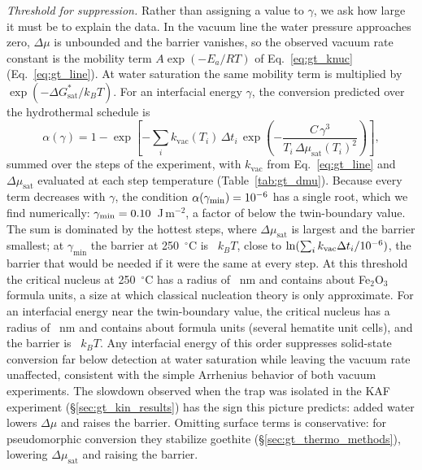 \textit{Threshold for suppression.} Rather than assigning a value to $\gamma$, we ask how large it
must be to explain the data. In the vacuum line the water pressure approaches zero, $\Delta\mu$ is
unbounded and the barrier vanishes, so the observed vacuum rate constant is the mobility term
$A\exp(-E_a/RT)$ of Eq.~\eqref{eq:gt_knuc} (Eq.~\eqref{eq:gt_line}). At water saturation the same mobility
term is multiplied by $\exp(-\Delta G^{*}_{\mathrm{sat}}/k_BT)$. For an interfacial energy $\gamma$, the
conversion predicted over the hydrothermal schedule is
\begin{equation}
  \alpha(\gamma) = 1-\exp\!\left[-\sum_i k_{\mathrm{vac}}(T_i)\,\Delta t_i\,
  \exp\!\left(-\frac{C\,\gamma^{3}}{T_i\,\Delta\mu_{\mathrm{sat}}(T_i)^{2}}\right)\right],
  \label{eq:gt_alpha_gamma}
\end{equation}
summed over the steps of the experiment, with $k_{\mathrm{vac}}$ from Eq.~\eqref{eq:gt_line} and
$\Delta\mu_{\mathrm{sat}}$ evaluated at each step temperature (Table~\ref{tab:gt_dmu}). Because every term
decreases with $\gamma$, the condition $\alpha(\gamma_{\min}) = 10^{-6}$ has a single root, which we
find numerically: $\gamma_{\min} = 0.10$~J\,m$^{-2}$, a factor of \ChTwoKinGammaRatio{} below the
twin-boundary value. The sum is dominated by the hottest steps, where $\Delta\mu_{\mathrm{sat}}$ is largest
and the barrier smallest; at $\gamma_{\min}$ the barrier at 250~$^\circ$C is \ChTwoKinBarMin~$k_BT$, close to
$\ln(\sum_i k_{\mathrm{vac}}\Delta t_i/10^{-6})$, the barrier that would be needed if it were the
same at every step. At this threshold the critical nucleus at 250~$^\circ$C has a radius of
\ChTwoKinRstarMin~nm and contains about \ChTwoKinNfuMin{} Fe$_2$O$_3$ formula units, a size at which
classical nucleation theory is only approximate. For an interfacial energy near the twin-boundary
value, the critical nucleus has a radius of \ChTwoKinRstarTwin~nm and contains about \ChTwoKinNfuTwin{}
formula units (several hematite unit cells), and the barrier is \ChTwoKinBarTwin~$k_BT$. Any
interfacial energy of this order suppresses solid-state conversion far below detection at water
saturation while leaving the vacuum rate unaffected, consistent with the simple Arrhenius behavior of
both vacuum experiments. The slowdown observed when the trap was isolated in the KAF experiment
(\S\ref{sec:gt_kin_results}) has the sign this picture predicts: added water lowers $\Delta\mu$ and raises the
barrier. Omitting surface terms is conservative: for pseudomorphic conversion they stabilize
goethite (\S\ref{sec:gt_thermo_methods}), lowering $\Delta\mu_{\mathrm{sat}}$ and raising the barrier.

